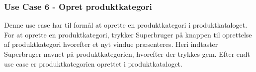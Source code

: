 \subsubsection{Use Case 6 - Opret produktkategori}
Denne use case har til formål at oprette en produktkategori i produktkataloget. For at oprette en produktkategori, trykker Superbruger på knappen til oprettelse af produktkategori hvorefter et nyt vindue præsenteres. Heri indtaster Superbruger navnet på produktkategorien, hvorefter der trykkes gem. Efter endt use case er produktkategorien oprettet i produktkataloget.